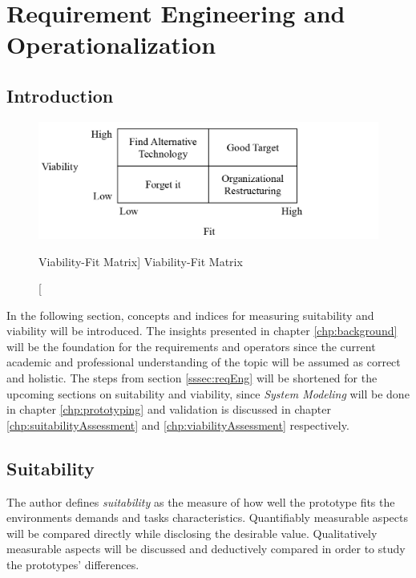 
\chapter{Requirement Engineering and Operationalization}\label{chp:operationalization}

\section{Introduction}

\begin{figure}[ht]
    \includegraphics[width=\linewidth]{images/methodology/viabFit.PNG}\centering
    \caption
    [Viability-Fit Matrix]
    {Viability-Fit Matrix \cite{Liang2004IntroductionApplications}}
\end{figure}

In the following section, concepts and indices for measuring suitability and viability will be introduced. The insights presented in chapter \ref{chp:background} will be the foundation for the requirements and operators since the current academic and professional understanding of the topic will be assumed as correct and holistic. The steps from section \ref{sssec:reqEng} will be shortened for the upcoming sections on suitability and viability, since \textit{System Modeling} will be done in chapter \ref{chp:prototyping} and validation is discussed in chapter \ref{chp:suitabilityAssessment} and \ref{chp:viabilityAssessment} respectively.  

\section{Suitability}

The author defines \textit{suitability} as the measure of how well the prototype fits the environments demands and tasks characteristics. Quantifiably measurable aspects will be compared directly while disclosing the desirable value. Qualitatively measurable aspects will be discussed and deductively compared in order to study the prototypes' differences. 

